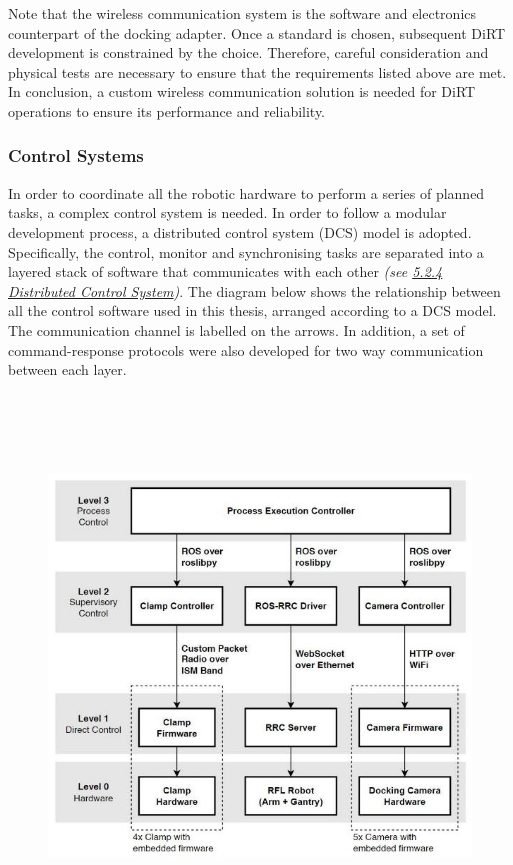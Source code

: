 \documentclass[11pt]{book}
\begin{document}
Note that the wireless communication system is the software and electronics counterpart of the docking adapter. Once a standard is chosen, subsequent DiRT development is constrained by the choice. Therefore, careful consideration and physical tests are necessary to ensure that the requirements listed above are met. In conclusion, a custom wireless communication solution is needed for DiRT operations to ensure its performance and reliability.

\subsubsection{Control Systems}

In order to coordinate all the robotic hardware to perform a series of planned tasks, a complex control system is needed. In order to follow a modular development process, a distributed control system (DCS) model is adopted. Specifically, the control, monitor and synchronising tasks are separated into a layered stack of software that communicates with each other \textit{(see \uline{5.2.4 Distributed Control System})}. The diagram below shows the relationship between all the control software used in this thesis, arranged according to a DCS model. The communication channel is labelled on the arrows. In addition, a set of command-response protocols were also developed for two way communication between each layer. 

\begin{figure}[H]
\includegraphics[width=15.92cm,height=14.36cm]{./images/image3.jpeg}
\end{figure}
\end{document}
